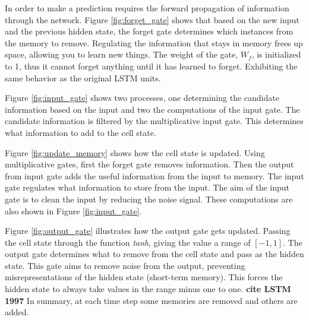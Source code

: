 In order to make a prediction requires the forward propagation of information through the network. Figure \ref{fig:forget_gate} shows that based on the new input and the previous hidden state, the forget gate determines which instances from the memory to remove. Regulating the information that stays in memory frees up space, allowing you to learn new things. The weight of the gate, $W_f$, is initialized to 1, thus it cannot forget anything until it has learned to forget. Exhibiting the same behavior as the original LSTM units. 

Figure \ref{fig:input_gate} shows two processes, one determining the candidate information based on the input and two the computations of the input gate. The candidate information is filtered by the multiplicative input gate. This determines what information to add to the cell state.

Figure \ref{fig:update_memory} shows how the cell state is updated. Using multiplicative gates, first the forget gate removes information. Then the output from input gate adds the useful information from the input to memory. The input gate regulates what information to store from the input. The aim of the input gate is to clean the input by reducing the noise signal. These computations are also shown in Figure \ref{fig:input_gate}.

Figure \ref{fig:output_gate} illustrates how the output gate gets updated. Passing the cell state through the function \textit{tanh}, giving the value a range of $[-1, 1]$. The output gate determines what to remove from the cell state and pass as the hidden state. This gate aims to remove noise from the output, preventing misrepresentations of the hidden state (short-term memory). This forces the hidden state to always take values in the range minus one to one. \textbf{cite LSTM 1997} In summary, at each time step some memories are removed and others are added. 


